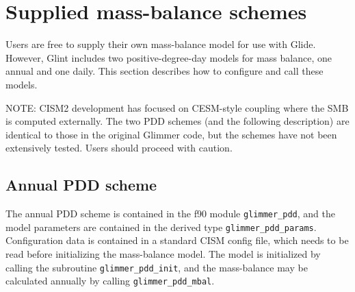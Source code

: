 %


\section{Supplied mass-balance schemes}


Users are free to supply their own mass-balance model for use
with Glide. However, Glint includes two positive-degree-day models
for mass balance, one annual and one daily.
This section describes how to configure and call these models.

NOTE: CISM2 development has focused on CESM-style coupling where the SMB
is computed externally.  The two PDD schemes (and the following description)
are identical to those in the original Glimmer code, but the schemes 
have not been extensively tested. Users should proceed with caution.

\subsection{Annual PDD scheme}
\label{ug.mbal.pdd_scheme}
The annual PDD scheme is contained in the f90 module \texttt{glimmer\_pdd},
and the model parameters are contained in the derived type
\texttt{glimmer\_pdd\_params}. Configuration data is contained in a standard
CISM config file, which needs to be read before initializing the
mass-balance model. The model is initialized by calling the subroutine
\texttt{glimmer\_pdd\_init}, and the mass-balance may be calculated annually
by calling \texttt{glimmer\_pdd\_mbal}. 

